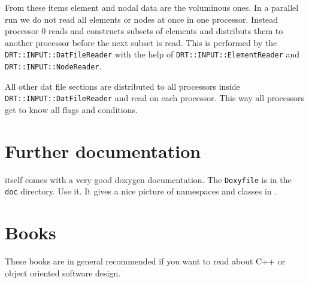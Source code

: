 From these items element and nodal data are the voluminous ones. In a parallel
run we do not read all elements or nodes at once in one processor. Instead
processor 0 reads and constructs subsets of elements and distributs them to
another processor before the next subset is read. This is performed by the
\texttt{DRT::INPUT::DatFileReader} with the help of
\texttt{DRT::INPUT::ElementReader} and \texttt{DRT::INPUT::NodeReader}.

All other dat file sections are distributed to all processors inside
\texttt{DRT::INPUT::DatFileReader} and read on each processor. This way all
processors get to know all flags and conditions.

\section{Further documentation}

\baci{} itself comes with a very good doxygen documentation. The
\texttt{Doxyfile} is in the \texttt{doc} directory. Use it. It gives a nice
picture of namespaces and classes in \baci{}.

\section{Books}

These books are in general recommended if you want to read about C++ or
object oriented software design.

